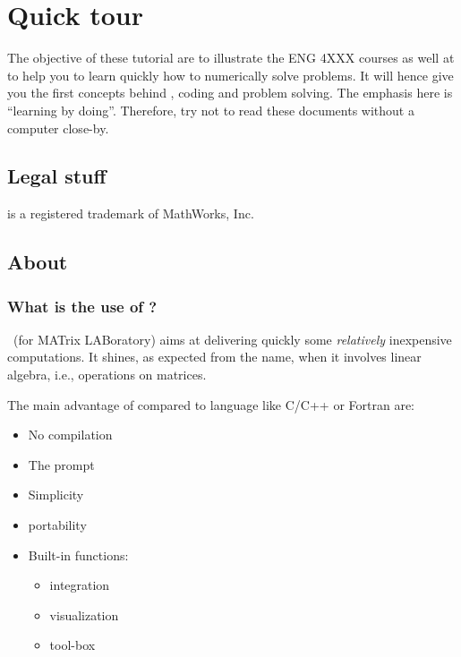 



\chapter{Quick tour \matlab}
	The objective of these tutorial are to illustrate the ENG 4XXX courses as well at to help you to learn quickly how to numerically solve problems.
	It will hence give you the first concepts behind \matlab, coding and problem solving.
	The emphasis here is “learning by doing”. Therefore, try not to read these documents without a computer close-by.

\section*{Legal stuff}
\matlab is a registered trademark of MathWorks, Inc.



\section{About \matlab}
	\subsection{What is the use of \matlab ?}
		\matlab~(for MATrix LABoratory) aims at delivering quickly some \emph{relatively} inexpensive computations.
		It shines, as expected from the name, when it involves linear algebra, i.e., operations on matrices.

		The main advantage of \matlab compared to language like C/C++ or Fortran are:
		\begin{itemize}
			\item No compilation
			\item The prompt
			\item Simplicity
			\item portability
			\item Built-in functions:
				\begin{itemize}
					\item integration
					\item visualization
					\item tool-box
				\end{itemize}
		\end{itemize}

